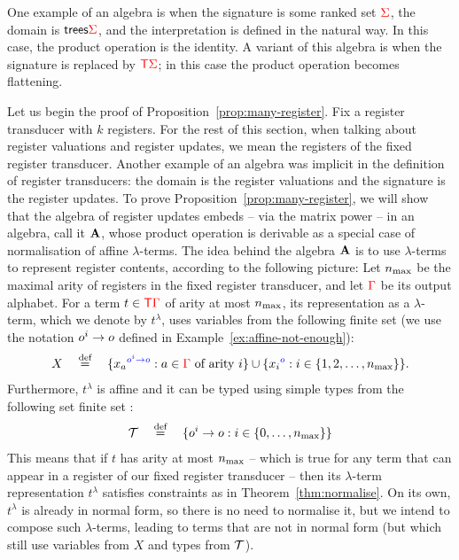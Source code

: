 One example of an algebra is when the signature is some ranked set ${\color{red}{\Sigma}}$, the domain is  $\mathsf {trees} {\color{red}{\Sigma}}$, and the interpretation is defined in the natural way. In this case, the product operation is the identity. A variant of this algebra is when the signature is replaced by ${\color{red}{\mathsf T}} {\color{red}{\Sigma}}$; in this case the product operation becomes flattening. 

Let us begin the proof of Proposition~\ref{prop:many-register}.
Fix a register transducer with $k$ registers. For the rest of this section, when talking about register valuations and register updates, we mean the registers of the fixed register transducer.
Another example of an algebra was implicit in the definition of register transducers: the domain is the register valuations and the signature is the  register updates. To prove  Proposition~\ref{prop:many-register}, we will show that the algebra of register updates embeds -- via the matrix power -- in an algebra, call it ${\color{black}\mathbf A}$, whose product operation is derivable as a special case of normalisation of affine $\lambda$-terms. 
 The idea behind the algebra  ${\color{black}\mathbf A}$ is to use  $\lambda$-terms to represent register contents, according to the following picture:
    Let  $n_{\mathrm{max}}$  be the maximal arity of registers in the fixed register transducer, and let  ${\color{red}{\Gamma}}$ be its  output alphabet. For a term $t \in {\color{red}{\mathsf T}} {\color{red}{\Gamma}}$ of arity at most $n_{\mathrm{max}}$, its representation as a  $\lambda$-term, which we denote by $t^\lambda$,  uses variables from the following finite set (we use the notation $o^i \to o$ defined in Example~\ref{ex:affine-not-enough}):
\begin{align*}
X  \quad \stackrel{\text{def}}= \quad \{{x_a}^{\color{blue}{o^i \to o}} : a \in {\color{red}{\Gamma}} \text{ of arity $i$}\} \cup \{{x_i}^{\color{blue}{o}} : i \in \{1,2,\ldots,n_{\mathrm{max}} \}\}.
\end{align*}
Furthermore, $t^\lambda$ is affine and it can be typed using simple types  from  the following set finite set :
\begin{align*}
    {\mathcal T} \quad \stackrel{\text{def}}= \quad \{o^i \to o : i \in \{0,\ldots,n_{\mathrm{max}}\}\}
\end{align*}
This means that if $t$ has arity at most $n_{\mathrm{max}}$ -- which is true for any term that can appear in a register of our fixed register transducer -- then its $\lambda$-term representation $t^\lambda$ satisfies constraints as in Theorem~\ref{thm:normalise}.  On its own, $t^\lambda$ is already in normal form, so there is no need to normalise it, but we intend to compose  such $\lambda$-terms, leading to terms that are not in normal form (but which still use variables from $X$ and types from ${\mathcal T}$). 
